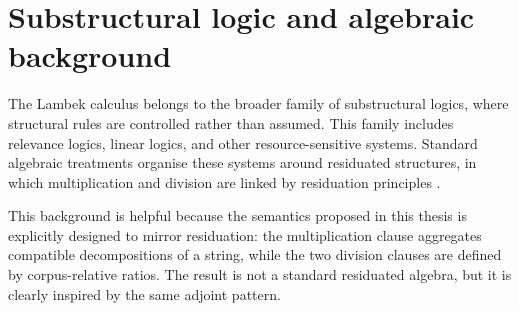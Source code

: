 \section{Substructural logic and algebraic background}
The Lambek calculus belongs to the broader family of substructural logics, where structural
rules are controlled rather than assumed. This family includes relevance logics, linear logics, and
other resource-sensitive systems. Standard algebraic treatments organise these systems around
residuated structures, in which multiplication and division are linked by residuation principles
\citep{GalatosJipsenKowalskiOno2007,DosenSchroederHeister1993}.

This background is helpful because the semantics proposed in this thesis is explicitly designed to
mirror residuation: the multiplication clause aggregates compatible decompositions of a string,
while the two division clauses are defined by corpus-relative ratios. The result is not a standard
residuated algebra, but it is clearly inspired by the same adjoint pattern.

